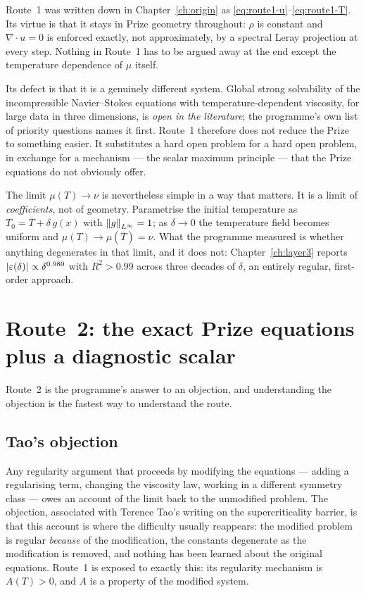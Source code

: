 Route~1 was written down in Chapter~\ref{ch:origin} as
\eqref{eq:route1-u}--\eqref{eq:route1-T}. Its virtue is that it stays in Prize
geometry throughout: \(\rho\) is constant and \(\nabla\cdot u=0\) is enforced
exactly, not approximately, by a spectral Leray projection at every step.
Nothing in Route~1 has to be argued away at the end except the temperature
dependence of \(\mu\) itself.

Its defect is that it is a genuinely different system. Global strong
solvability of the incompressible Navier--Stokes equations with
temperature-dependent viscosity, for large data in three dimensions, is
\emph{open in the literature}; the programme's own list of priority questions
names it first. Route~1 therefore does not reduce the Prize to something
easier. It substitutes a hard open problem for a hard open problem, in
exchange for a mechanism --- the scalar maximum principle --- that the Prize
equations do not obviously offer.

The limit \(\mu(T)\to\nu\) is nevertheless simple in a way that matters. It is
a limit of \emph{coefficients}, not of geometry. Parametrise the initial
temperature as \(T_0=\bar T+\delta\,g(x)\) with \(\left\|g\right\|_{L^\infty}=1\); as
\(\delta\to0\) the temperature field becomes uniform and \(\mu(T)\to\mu(\bar
T)=\nu\). What the programme measured is whether anything degenerates in that
limit, and it does not: Chapter~\ref{ch:layer3} reports
\(\left|\varepsilon(\delta)\right|\propto\delta^{0.980}\) with \(R^2>0.99\) across
three decades of \(\delta\), an entirely regular, first-order approach.

\section{Route~2: the exact Prize equations plus a diagnostic scalar}
\label{sec:route2}

Route~2 is the programme's answer to an objection, and understanding the
objection is the fastest way to understand the route.

\subsection{Tao's objection}

Any regularity argument that proceeds by modifying the equations --- adding a
regularising term, changing the viscosity law, working in a different
symmetry class --- owes an account of the limit back to the unmodified
problem. The objection, associated with Terence Tao's writing on the
supercriticality barrier, is that this account is where the difficulty
usually reappears: the modified problem is regular \emph{because} of the
modification, the constants degenerate as the modification is removed, and
nothing has been learned about the original equations. Route~1 is exposed to
exactly this: its regularity mechanism is \(A(T)>0\), and \(A\) is a property
of the modified system.

